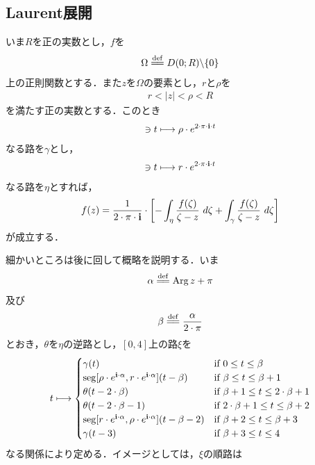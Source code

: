 \subsection{Laurent展開}

	いま$R$を正の実数とし，$f$を
	\begin{align}
		\Omega \defeq \disc{0}{R} \backslash \{0\}
	\end{align}
	上の正則関数とする．また$z$を$\Omega$の要素とし，$r$と$\rho$を
	\begin{align}
		r < |z| < \rho < R
	\end{align}
	を満たす正の実数とする．このとき
	\begin{align}
		[0,1] \ni t \longmapsto \rho \cdot e^{2 \cdot \pi \cdot \isym \cdot t}
	\end{align}
	なる路を$\gamma$とし，
	\begin{align}
		[0,1] \ni t \longmapsto r \cdot e^{2 \cdot \pi \cdot \isym \cdot t}
	\end{align}
	なる路を$\eta$とすれば，
	\begin{align}
		f(z) = \frac{1}{2 \cdot \pi \cdot \mathbf{i}} \cdot 
		\left[-\int_{\eta} \frac{f(\zeta)}{\zeta-z}\ d\zeta + \int_{\gamma} \frac{f(\zeta)}{\zeta-z}\ d\zeta\right]
		\label{fom:Laurent_series_1}
	\end{align}
	が成立する．
	
	細かいところは後に回して概略を説明する．いま
	\begin{align}
		\alpha \defeq \pvarg{z} + \pi
	\end{align}
	及び
	\begin{align}
		\beta \defeq \frac{\alpha}{2 \cdot \pi}
	\end{align}
	とおき，$\theta$を$\eta$の逆路とし，$[0,4]$上の路$\xi$を
	\begin{align}
		t \longmapsto
		\begin{cases}
			\gamma(t) & \mbox{if } 0 \leq t \leq \beta \\
			\operatorname{seg}[\rho \cdot e^{\mathbf{i} \cdot \alpha},r \cdot e^{\mathbf{i} \cdot \alpha}](t-\beta) & \mbox{if } \beta \leq t \leq \beta + 1 \\
			\theta(t-2\cdot\beta) & \mbox{if } \beta + 1 \leq t \leq 2\cdot\beta + 1 \\
			\theta(t-2\cdot\beta-1) & \mbox{if } 2\cdot\beta + 1 \leq t \leq \beta + 2 \\
			 \operatorname{seg}[r \cdot e^{\mathbf{i} \cdot \alpha},\rho \cdot e^{\mathbf{i} \cdot \alpha}](t-\beta-2) & \mbox{if } \beta + 2 \leq t \leq \beta + 3 \\
			\gamma(t-3) & \mbox{if } \beta + 3 \leq t \leq 4
		\end{cases}
	\end{align}
	なる関係により定める．イメージとしては，$\xi$の順路は
	
